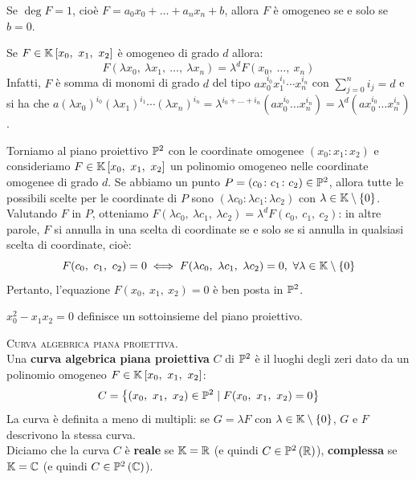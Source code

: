 \begin{observe}
Se $\deg F=1$, cioè $F=a_0x_0+\ldots+a_nx_n+b$, allora $F$ è omogeneo se e solo se $b=0$.
\end{observe}

\begin{observe}
Se $F\in\kamp\left[x_0,\ x_1,\ x_2\right]$ è omogeneo di grado $d$ allora:
\begin{equation}
F(\lambda x_0,\ \lambda x_1,\ \ldots,\ \lambda x_n)=\lambda^d F(x_0,\ \ldots,\ x_n)
\end{equation}
Infatti, $F$ è somma di monomi di grado $d$ del tipo $ax_0^{i_0}x_1^{i_1}\cdots x_n^{i_n}$ con $\displaystyle\sum_{j=0}^n i_j=d$ e si ha che $a(\lambda x_0)^{i_0} (\lambda x_1)^{i_1} \cdots (\lambda x_n)^{i_n}=\lambda^{i_0+\ldots +i_n} (ax_0^{i_0}\ldots x_n^{i_n})=\lambda^d(ax_0^{i_0}\ldots x_n^{i_n})$.
\end{observe}
Torniamo al piano proiettivo $\proj[2]{\ }$ con le coordinate omogenee $(x_0\colon x_1\colon x_2)$ e consideriamo $F\in\kamp\left[x_0,\ x_1,\ x_2\right]$ un polinomio omogeneo nelle coordinate omogenee di grado $d$. Se abbiamo un punto $P=(c_0\colon c_1\colon c_2)\in\proj[2]{\ }$, allora tutte le possibili scelte per le coordinate di $P$ sono $(\lambda c_0\colon \lambda c_1 \colon \lambda c_2)$ con $\lambda\in\mathbb{K}\setminus\{0\}$. Valutando $F$ in $P$, otteniamo $F(\lambda c_0,\ \lambda c_1,\ \lambda c_2)=\lambda^d F(c_0,\ c_1,\ c_2)$: in altre parole, $F$ si annulla in una scelta di coordinate se e solo se si annulla in qualsiasi scelta di coordinate, cioè: 
\begin{equation*}
F(c_0,\ c_1,\ c_2)=0\iff F(\lambda c_0,\ \lambda c_1,\ \lambda c_2)=0,\ \forall \lambda\in\mathbb{K}\setminus\{0\}
\end{equation*}
Pertanto, l'equazione $F(x_0,\ x_1,\ x_2)=0$ è ben posta in $\proj[2]{\ }$.
\begin{example}
$x_0^2-x_1x_2=0$ definisce un sottoinsieme del piano proiettivo.
\end{example}
\begin{define}\textsc{Curva algebrica piana proiettiva}.\\
	Una \textbf{curva algebrica piana proiettiva} $C$ di $\proj[2]{\ }$ è il luoghi degli zeri dato da un polinomio omogeneo $F\in\kamp\left[x_0,\ x_1,\ x_2\right]$:
	\begin{equation}
		C=\left\{(x_0,\ x_1,\ x_2)\in\proj[2]{\ }\mid F(x_0,\ x_1,\ x_2)=0\right\}
	\end{equation}
	La curva è definita a meno di multipli: se $G=\lambda F$ con $\lambda\in\mathbb{K}\setminus\left\{0\right\}$, $G$ e $F$ descrivono la stessa curva.\\
	Diciamo che la curva $C$ è \textbf{reale} se $\mathbb{K}=\mathbb{R}$ (e quindi $C\in\proj[2]{\realset}$), \textbf{complessa} se $\mathbb{K}=\mathbb{C}$ (e quindi $C\in\proj[2]{\complexset}$).
\end{define}
